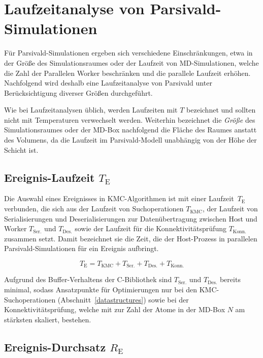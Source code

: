 \section{Laufzeitanalyse von Parsivald-Simulationen}
\label{runtime}

Für Parsivald-Simulationen ergeben sich verschiedene Einschränkungen, etwa in der Größe des Simulationsraumes oder der Laufzeit von MD-Simulationen, welche die Zahl der Parallelen Worker beschränken und die parallele Laufzeit erhöhen.
Nachfolgend wird deshalb eine Laufzeitanalyse von Parsivald unter Berücksichtigung diverser Größen durchgeführt.

Wie bei Laufzeitanalysen üblich, werden Laufzeiten mit $T$ bezeichnet und sollten nicht mit Temperaturen verwechselt werden.
Weiterhin bezeichnet die \textit{Größe} des Simulationsraumes oder der MD-Box nachfolgend die Fläche des Raumes anstatt des Volumens, da die Laufzeit im Parsivald-Modell unabhängig von der Höhe der Schicht ist.

\subsection{Ereignis-Laufzeit \texorpdfstring{$T_\text{E}$}{TE}}

Die Auswahl eines Ereignisses in KMC-Algorithmen ist mit einer Laufzeit~$T_\text{E}$ verbunden, die sich aus der Laufzeit von Suchoperationen $T_\text{KMC}$, der Laufzeit von Serialisierungen und Deserialisierungen zur Datenübertragung zwischen Host und Worker $T_\text{Ser.}$ und $T_\text{Des.}$ sowie der Laufzeit für die Konnektivitätsprüfung $T_\text{Konn.}$ zusammen setzt.
Damit bezeichnet sie die Zeit, die der Host-Prozess in parallelen Parsivald-Simulationen für ein Ereignis aufbringt.

\begin{equation}
T_\text{E} = T_\text{KMC} + T_\text{Ser.} + T_\text{Des.} + T_\text{Konn.}
\end{equation}

Aufgrund des Buffer-Verhaltens der C-Bibliothek sind $T_\text{Ser.}$ und $T_\text{Des.}$ bereits minimal, sodass Ansatzpunkte für Optimierungen nur bei den KMC-Suchoperationen (Abschnitt~\ref{datastructures}) sowie bei der Konnektivitätsprüfung, welche mit  zur Zahl der Atome in der MD-Box $N$ am stärksten skaliert, bestehen.

\subsection{Ereignis-Durchsatz \texorpdfstring{$R_\text{E}$}{RE}}

